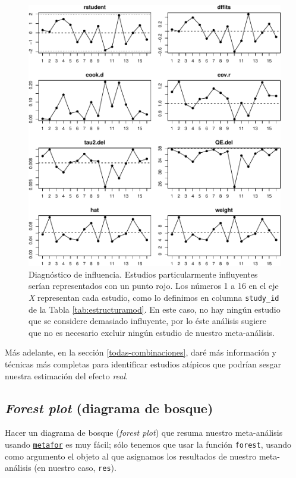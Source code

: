 \documentclass[
  bookmarksnumbered]{article}
\begin{document}
\begin{figure}
\centering
\includegraphics{Meta-analysis_files/figure-latex/infplot-1.pdf}
\caption{\label{fig:infplot}Diagnóstico de influencia. Estudios particularmente influyentes serían representados con un punto rojo. Los números 1 a 16 en el eje \emph{X} representan cada estudio, como lo definimos en columna \texttt{study\_id} de la Tabla \ref{tab:estructuramod}. En este caso, no hay ningún estudio que se considere demasiado influyente, por lo éste análisis sugiere que no es necesario excluir ningún estudio de nuestro meta-análisis.}
\end{figure}

Más adelante, en la sección \ref{todas-combinaciones}, daré más información y técnicas más completas para identificar estudios atípicos que podrían sesgar nuestra estimación del efecto \emph{real}.

\hypertarget{forest-inf}{%
\subsection{\texorpdfstring{\emph{Forest plot} (diagrama de bosque)}{Forest plot (diagrama de bosque)}}\label{forest-inf}}

Hacer un diagrama de bosque (\emph{forest plot}) que resuma nuestro meta-análisis usando \href{https://www.metafor-project.org/doku.php}{\texttt{metafor}} es muy fácil; sólo tenemos que usar la función \texttt{forest}, usando como argumento el objeto al que asignamos los resultados de nuestro meta-análisis (en nuestro caso, \texttt{res}).
\end{document}
